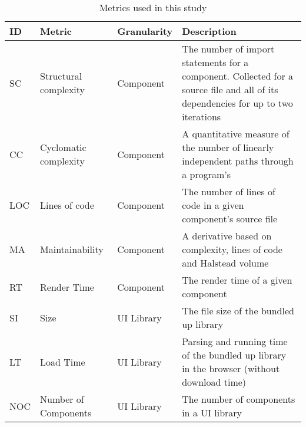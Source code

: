 \begin{table}[h]
	\tiny
	\begin{tabularx}{\columnwidth}{l|l|l|X}
		\toprule
		\textbf{ID} & \textbf{Metric}       & \textbf{Granularity} & \textbf{Description}                                                                                                              \\ \midrule
		SC          & Structural complexity & Component            & The number of import statements for a component. Collected for a source file and all of its dependencies for up to two iterations \\ \hline
		CC          & Cyclomatic complexity & Component            & A quantitative measure of the number of linearly independent paths through a program's~\cite{1702388}                             \\ \hline
		LOC         & Lines of code         & Component            & The number of lines of code in a given component's source file                                                                    \\ \hline
		MA          & Maintainability       & Component            & A derivative based on complexity, lines of code and Halstead volume~\cite{halstead1977elements}                                   \\ \hline
		RT          & Render Time           & Component            & The render time of a given component                                                                                              \\ \hline
		SI          & Size                  & UI Library           & The file size of the bundled up library                                                                                           \\ \hline
		LT          & Load Time             & UI Library           & Parsing and running time of the bundled up library in the browser (without download time)                                         \\ \hline
		NOC         & Number of Components  & UI Library           & The number of components in a UI library                                                                                          \\
	\end{tabularx}
	\caption{Metrics used in this study}
	\label{tab:design:metrics}
\end{table}


